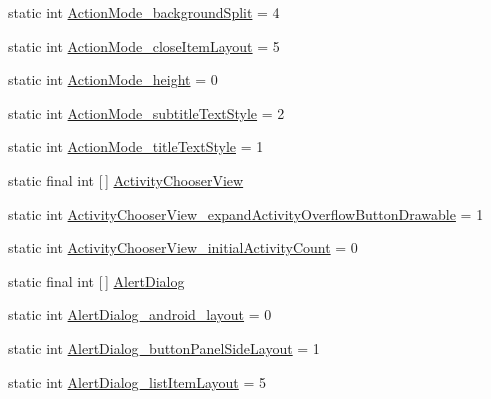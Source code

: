 \begin{DoxyCompactItemize}
\item 
static int \hyperlink{classandroid_1_1support_1_1v7_1_1mediarouter_1_1R_1_1styleable_a964de6792a0ef91d9a277bff3796c597}{Action\+Mode\+\_\+background\+Split} = 4
\item 
static int \hyperlink{classandroid_1_1support_1_1v7_1_1mediarouter_1_1R_1_1styleable_a544a453f2ea1703ee087d75cc3da448d}{Action\+Mode\+\_\+close\+Item\+Layout} = 5
\item 
static int \hyperlink{classandroid_1_1support_1_1v7_1_1mediarouter_1_1R_1_1styleable_a6b8d66b42ebc726d21097cf62e090d8a}{Action\+Mode\+\_\+height} = 0
\item 
static int \hyperlink{classandroid_1_1support_1_1v7_1_1mediarouter_1_1R_1_1styleable_a7c9b319454742dd79494960a4a144757}{Action\+Mode\+\_\+subtitle\+Text\+Style} = 2
\item 
static int \hyperlink{classandroid_1_1support_1_1v7_1_1mediarouter_1_1R_1_1styleable_a448e15fac45ca973519260e405b17757}{Action\+Mode\+\_\+title\+Text\+Style} = 1
\item 
static final int \mbox{[}$\,$\mbox{]} \hyperlink{classandroid_1_1support_1_1v7_1_1mediarouter_1_1R_1_1styleable_a053ff33215816ca018afd657dbf094a2}{Activity\+Chooser\+View}
\item 
static int \hyperlink{classandroid_1_1support_1_1v7_1_1mediarouter_1_1R_1_1styleable_a457330a114518bf1b63afb5c8d5d4ba4}{Activity\+Chooser\+View\+\_\+expand\+Activity\+Overflow\+Button\+Drawable} = 1
\item 
static int \hyperlink{classandroid_1_1support_1_1v7_1_1mediarouter_1_1R_1_1styleable_a85994d46283b79caf8459fb6bee0dc0e}{Activity\+Chooser\+View\+\_\+initial\+Activity\+Count} = 0
\item 
static final int \mbox{[}$\,$\mbox{]} \hyperlink{classandroid_1_1support_1_1v7_1_1mediarouter_1_1R_1_1styleable_a2c8307beccb0eb2a93adf87cab8ef939}{Alert\+Dialog}
\item 
static int \hyperlink{classandroid_1_1support_1_1v7_1_1mediarouter_1_1R_1_1styleable_a7fd72f79655c91f3af5eb5cb8f62fcef}{Alert\+Dialog\+\_\+android\+\_\+layout} = 0
\item 
static int \hyperlink{classandroid_1_1support_1_1v7_1_1mediarouter_1_1R_1_1styleable_ac63bd50a2885305595427ff4a1a5ee17}{Alert\+Dialog\+\_\+button\+Panel\+Side\+Layout} = 1
\item 
static int \hyperlink{classandroid_1_1support_1_1v7_1_1mediarouter_1_1R_1_1styleable_a3f39b9e36a043ea5be32a9b38cd3fadc}{Alert\+Dialog\+\_\+list\+Item\+Layout} = 5
\item 

\end{DoxyCompactItemize}
